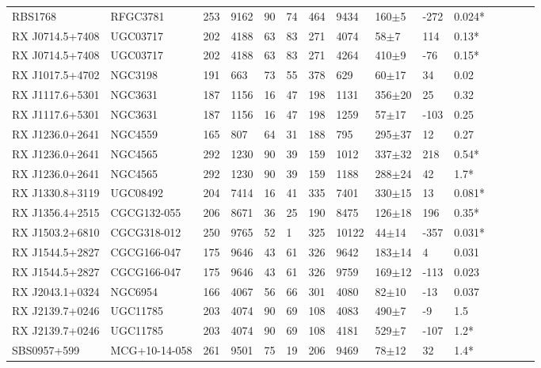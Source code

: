 \documentclass[twocolumn,tighten]{aastex6}
\begin{document}
\begin{table}[ht]
\begin{center}
\begin{tabular}{l l l l l l l l l l l l l l l}
RBS1768  &  RFGC3781  &  253  &  9162  &  90  &  74  &  464  &  9434  &  160$\pm$5  &  -272  &  0.024*  \\
RX J0714.5+7408  &  UGC03717  &  202  &  4188  &  63  &  83  &  271  &  4074  &  58$\pm$7  &  114  &  0.13*  \\
RX J0714.5+7408  &  UGC03717  &  202  &  4188  &  63  &  83  &  271  &  4264  &  410$\pm$9  &  -76  &  0.15*  \\
RX J1017.5+4702  &  NGC3198  &  191  &  663  &  73  &  55  &  378  &  629  &  60$\pm$17  &  34  &  0.02  \\
RX J1117.6+5301  &  NGC3631  &  187  &  1156  &  16  &  47  &  198  &  1131  &  356$\pm$20  &  25  &  0.32  \\
RX J1117.6+5301  &  NGC3631  &  187  &  1156  &  16  &  47  &  198  &  1259  &  57$\pm$17  &  -103  &  0.25  \\
RX J1236.0+2641  &  NGC4559  &  165  &  807  &  64  &  31  &  188  &  795  &  295$\pm$37  &  12  &  0.27  \\
RX J1236.0+2641  &  NGC4565  &  292  &  1230  &  90  &  39  &  159  &  1012  &  337$\pm$32  &  218  &  0.54*  \\
RX J1236.0+2641  &  NGC4565  &  292  &  1230  &  90  &  39  &  159  &  1188  &  288$\pm$24  &  42  &  1.7*  \\
RX J1330.8+3119  &  UGC08492  &  204  &  7414  &  16  &  41  &  335  &  7401  &  330$\pm$15  &  13  &  0.081*  \\
RX J1356.4+2515  &  CGCG132-055  &  206  &  8671  &  36  &  25  &  190  &  8475  &  126$\pm$18  &  196  &  0.35*  \\
RX J1503.2+6810  &  CGCG318-012  &  250  &  9765  &  52  &  1  &  325  &  10122  &  44$\pm$14  &  -357  &  0.031*  \\
RX J1544.5+2827  &  CGCG166-047  &  175  &  9646  &  43  &  61  &  326  &  9642  &  183$\pm$14  &  4  &  0.031  \\
RX J1544.5+2827  &  CGCG166-047  &  175  &  9646  &  43  &  61  &  326  &  9759  &  169$\pm$12  &  -113  &  0.023  \\
RX J2043.1+0324  &  NGC6954  &  166  &  4067  &  56  &  66  &  301  &  4080  &  82$\pm$10  &  -13  &  0.037  \\
RX J2139.7+0246  &  UGC11785  &  203  &  4074  &  90  &  69  &  108  &  4083  &  490$\pm$7  &  -9  &  1.5  \\
RX J2139.7+0246  &  UGC11785  &  203  &  4074  &  90  &  69  &  108  &  4181  &  529$\pm$7  &  -107  &  1.2*  \\
SBS0957+599  &  MCG+10-14-058  &  261  &  9501  &  75  &  19  &  206  &  9469  &  78$\pm$12  &  32  &  1.4*  \\

\end{tabular}
\end{center}
\end{table}
\end{document}
